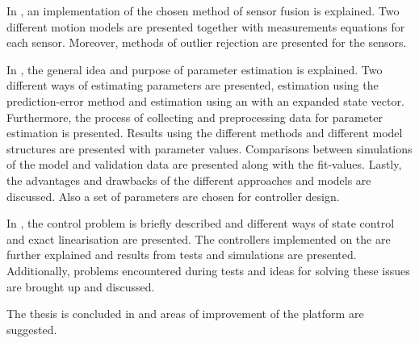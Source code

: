 In , an implementation of the chosen method of sensor fusion is explained. Two different motion models are presented together with measurements equations for each \abbrROV sensor. Moreover, methods of outlier rejection are presented for the sensors.

In , the general idea and purpose of parameter estimation is explained. Two different ways of estimating parameters are presented, estimation using the prediction-error method and estimation using an \abbrEKF with an expanded state vector. Furthermore, the process of collecting and preprocessing data for parameter estimation is presented. Results using the different methods and different model structures are presented with parameter values. Comparisons between simulations of the model and validation data are presented along with the fit-values. Lastly, the advantages and drawbacks of the different approaches and models are discussed. Also a set of parameters are chosen for controller design.

In , the control problem is briefly described and different ways of state control and exact linearisation are presented. The controllers implemented on the \abbrROV are further explained and results from tests and simulations are presented. Additionally, problems encountered during tests and ideas for solving these issues are brought up and discussed.

The thesis is concluded in  and areas of improvement of the \abbrROV platform are suggested. 
